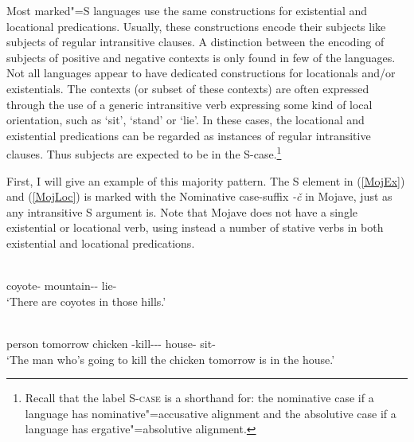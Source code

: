 Most marked"=S languages use the same constructions for existential and locational predications. 
Usually, these constructions encode their subjects like subjects of regular intransitive clauses. 
A distinction between the encoding of subjects of positive and negative contexts is only found in few of the languages. 
Not all languages appear to have dedicated constructions for locationals and/or existentials. 
The contexts (or subset of these contexts) are often expressed through the use of a generic intransitive verb expressing some kind of local orientation, such as `sit', `stand' or `lie'. 
In these cases, the locational and existential predications can be regarded as instances of regular intransitive clauses. 
Thus subjects are expected to be in the S-case.\footnote{Recall that the label \textsc{S-case} is a shorthand for: the nominative case if a language has nominative"=accusative alignment and the absolutive case if a language has ergative"=absolutive alignment.}  

First, I will give an example of this majority pattern. 
The S element in (\ref{MojEx}) and (\ref{MojLoc}) is marked with the Nominative case-suffix \emph{-\v c} in Mojave, just as any intransitive S argument is. 
Note that Mojave does not have a single existential or locational verb, using instead a number of stative verbs in both existential and locational predications.

\begin{exe}\ex{}
 \begin{xlist}
\ex\label{MojEx}\gll{}  \\
coyote-\nom{} mountain-\dem{}-\loc{} lie-\tns{}\\
\glt `There are coyotes in those hills.'

\ex\label{MojLoc}\gll{}     \\
person tomorrow chicken \relativ{}-kill-\irr{}-\dem{}-\nom{} house-\loc{} sit-\tns{}\\
\glt `The man who's going to kill the chicken tomorrow is in the house.'
\end{xlist}
\end{exe} 

